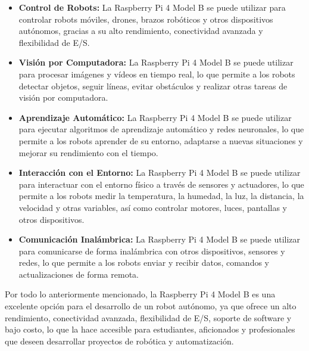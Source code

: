     \begin{itemize}
        \item \textbf{Control de Robots:} La Raspberry Pi 4 Model B se puede utilizar para controlar robots m\'oviles, 
            drones, brazos rob\'oticos y otros dispositivos aut\'onomos, gracias a su alto rendimiento, conectividad avanzada
            y flexibilidad de E/S.
        \item \textbf{Visi\'on por Computadora:} La Raspberry Pi 4 Model B se puede utilizar para procesar im\'agenes y 
            v\'ideos en tiempo real, lo que permite a los robots detectar objetos, seguir l\'ineas, evitar obst\'aculos y 
            realizar otras tareas de visi\'on por computadora.
        \item \textbf{Aprendizaje Autom\'atico:} La Raspberry Pi 4 Model B se puede utilizar para ejecutar algoritmos de 
            aprendizaje autom\'atico y redes neuronales, lo que permite a los robots aprender de su entorno, adaptarse a 
            nuevas situaciones y mejorar su rendimiento con el tiempo.
        \item \textbf{Interacci\'on con el Entorno:} La Raspberry Pi 4 Model B se puede utilizar para interactuar con el 
            entorno f\'isico a trav\'es de sensores y actuadores, lo que permite a los robots medir la temperatura, la 
            humedad, la luz, la distancia, la velocidad y otras variables, as\'i como controlar motores, luces, pantallas 
            y otros dispositivos.
        \item \textbf{Comunicaci\'on Inal\'ambrica:} La Raspberry Pi 4 Model B se puede utilizar para comunicarse de forma 
            inal\'ambrica con otros dispositivos, sensores y redes, lo que permite a los robots enviar y recibir datos, 
            comandos y actualizaciones de forma remota.
    \end{itemize}
    \vskip 0.5cm
    Por todo lo anteriormente mencionado, la Raspberry Pi 4 Model B es una excelente opci\'on para el desarrollo de un robot 
        aut\'onomo, ya que ofrece un alto rendimiento, conectividad avanzada, flexibilidad de E/S, soporte de software y bajo 
        costo, lo que la hace accesible para estudiantes, aficionados y profesionales que deseen desarrollar proyectos de rob\'otica 
        y automatizaci\'on.
